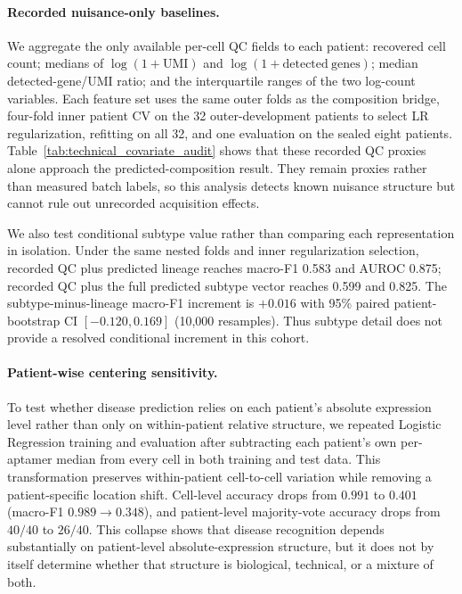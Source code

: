\documentclass{article} %
\begin{document}
\paragraph{Recorded nuisance-only baselines.}
We aggregate the only available per-cell QC fields to each patient: recovered
cell count; medians of $\log(1+\mathrm{UMI})$ and
$\log(1+\mathrm{detected\ genes})$; median detected-gene/UMI ratio; and the
interquartile ranges of the two log-count variables. Each feature set uses the
same outer folds as the composition bridge, four-fold inner patient CV on the
32 outer-development patients to select LR regularization, refitting on all 32,
and one evaluation on the sealed eight patients. Table~\ref{tab:technical_covariate_audit}
shows that these recorded QC proxies alone approach the predicted-composition
result. They remain proxies rather than measured batch labels, so this analysis
detects known nuisance structure but cannot rule out unrecorded acquisition
effects.

We also test conditional subtype value rather than comparing each representation
in isolation. Under the same nested folds and inner regularization selection,
recorded QC plus predicted lineage reaches macro-F1 0.583 and AUROC 0.875;
recorded QC plus the full predicted subtype vector reaches 0.599 and 0.825. The
subtype-minus-lineage macro-F1 increment is $+0.016$ with 95\% paired
patient-bootstrap CI $[-0.120,0.169]$ (10{,}000 resamples). Thus subtype detail
does not provide a resolved conditional increment in this cohort.




\paragraph{Patient-wise centering sensitivity.}
To test whether disease prediction relies on each patient's absolute expression level rather than only on within-patient relative structure, we repeated Logistic Regression training and evaluation after subtracting each patient's own per-aptamer median from every cell in both training and test data. This transformation preserves within-patient cell-to-cell variation while removing a patient-specific location shift. Cell-level accuracy drops from $0.991$ to $0.401$ (macro-F1 $0.989 \to 0.348$), and patient-level majority-vote accuracy drops from $40/40$ to $26/40$. This collapse shows that disease recognition depends substantially on patient-level absolute-expression structure, but it does not by itself determine whether that structure is biological, technical, or a mixture of both.
\end{document}
